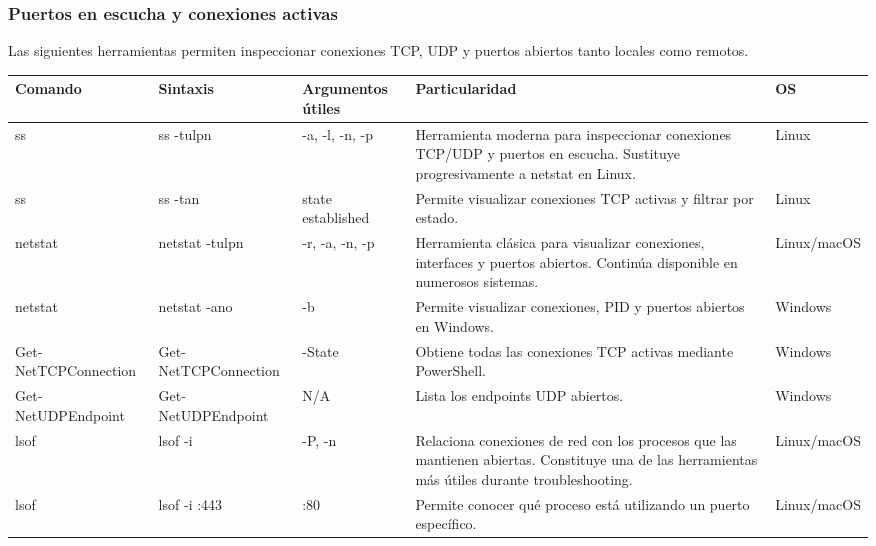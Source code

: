 \documentclass[a4paper,10pt]{article}
\begin{document}

\subsubsection{Puertos en escucha y conexiones activas}

Las siguientes herramientas permiten inspeccionar conexiones TCP, UDP y
puertos abiertos tanto locales como remotos.

\begin{longtable}{|p{2.8cm}|p{3cm}|p{4cm}|p{5.6cm}|p{1.5cm}|}

\hline
Comando &
Sintaxis &
Argumentos útiles &
Particularidad &
OS
\\
\hline
\endhead

ss &
ss -tulpn &
-a, -l, -n, -p &
Herramienta moderna para inspeccionar conexiones TCP/UDP y puertos en escucha. Sustituye progresivamente a netstat en Linux. &
Linux
\\
\hline

ss &
ss -tan &
state established &
Permite visualizar conexiones TCP activas y filtrar por estado. &
Linux
\\
\hline

netstat &
netstat -tulpn &
-r, -a, -n, -p &
Herramienta clásica para visualizar conexiones, interfaces y puertos abiertos. Continúa disponible en numerosos sistemas. &
Linux/macOS
\\
\hline

netstat &
netstat -ano &
-b &
Permite visualizar conexiones, PID y puertos abiertos en Windows. &
Windows
\\
\hline

Get-NetTCPConnection &
Get-NetTCPConnection &
-State &
Obtiene todas las conexiones TCP activas mediante PowerShell. &
Windows
\\
\hline

Get-NetUDPEndpoint &
Get-NetUDPEndpoint &
N/A &
Lista los endpoints UDP abiertos. &
Windows
\\
\hline

lsof &
lsof -i &
-P, -n &
Relaciona conexiones de red con los procesos que las mantienen abiertas. Constituye una de las herramientas más útiles durante troubleshooting. &
Linux/macOS
\\
\hline

lsof &
lsof -i :443 &
:80 &
Permite conocer qué proceso está utilizando un puerto específico. &
Linux/macOS
\\
\hline


\end{longtable}
\end{document}
